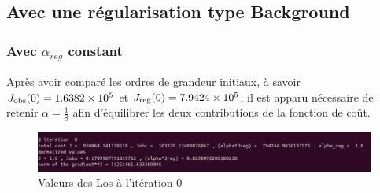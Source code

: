 \documentclass{article}
\begin{document}
\subsection{Avec une régularisation type Background}
\subsubsection{Avec $\alpha_{reg}$ constant}
Après avoir comparé les ordres de grandeur initiaux, à savoir \(J_{\rm obs}(0)=1.6382\times10^5\) et \(J_{\rm reg}(0)=7.9424\times10^5\), il est apparu nécessaire de retenir \(\alpha=\tfrac{1}{8}\) afin d’équilibrer les deux contributions de la fonction de coût.


\begin{figure}[H]
    \centering
    \includegraphics[width=0.8\linewidth]{Images_Ayoub/With_Regularisation/Alpha_Const/Pasted image.png}
    \caption{Valeurs des Los à l'itération 0}
    \label{fig:enter-label}
\end{figure}
\end{document}
